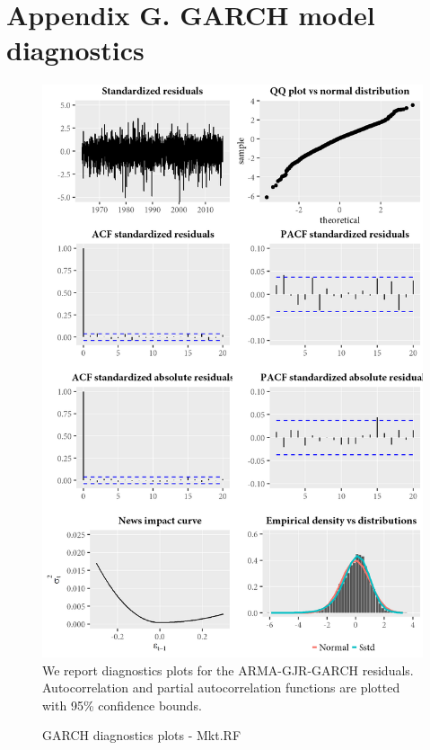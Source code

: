 \section{Appendix G. GARCH model diagnostics}
\label{App:AppendixG}
\begin{figure}[H]
  \caption{GARCH diagnostics plots - Mkt.RF}
  \label{diag:garchdiagMkt.RF}
  \centering
  \begin{minipage}{\textwidth}
  \includegraphics[scale=1]{graphics/garch/garch_diagnosticsMkt.RF.png}  
  \vspace{3mm}
  \footnotesize
  We report diagnostics plots for the ARMA-GJR-GARCH residuals. Autocorrelation and partial autocorrelation functions are plotted with 95\% confidence bounds.
  \end{minipage}
\end{figure}
